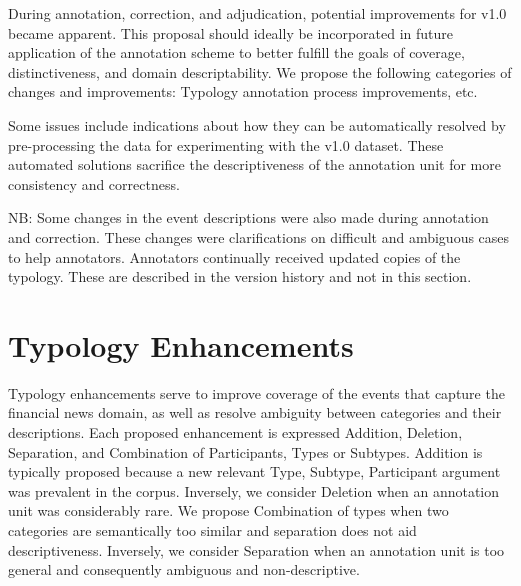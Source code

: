 During annotation, correction, and adjudication, potential improvements for \scheme v1.0 became apparent. This proposal should ideally be incorporated in future application of the annotation scheme to better fulfill the goals of coverage, distinctiveness, and domain descriptability. We propose the following categories of changes and improvements: Typology annotation process improvements, etc.

Some issues include indications about how they can be automatically resolved by pre-processing the data for experimenting with the v1.0 dataset. These automated solutions sacrifice the descriptiveness of the annotation unit for more consistency and correctness.

NB: Some changes in the event descriptions were also made during annotation and correction. These changes were clarifications on difficult and ambiguous cases to help annotators. Annotators continually received updated copies of the typology. These are described in the version history and not in this section.

\section{Typology Enhancements}
Typology enhancements serve to improve coverage of the events that capture the financial news domain, as well as resolve ambiguity between categories and their descriptions.
Each proposed enhancement is expressed Addition, Deletion, Separation, and Combination of Participants, Types or Subtypes.
Addition is typically proposed because a new relevant Type, Subtype, Participant argument was prevalent in the corpus.
Inversely, we consider Deletion when an annotation unit was considerably rare.
We propose Combination of types when two categories are semantically too similar and separation does not aid descriptiveness.
Inversely, we consider Separation when an annotation unit is too general and consequently ambiguous and non-descriptive.

